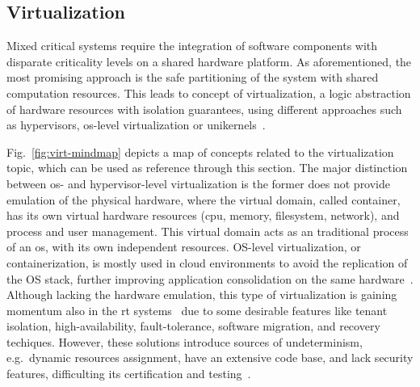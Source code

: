 
\subsection{Virtualization}%
\label{sec:virtualization}
Mixed critical systems require the integration of software components with
disparate criticality levels on a shared hardware platform. As aforementioned,
the most promising approach is the safe partitioning of the system with shared
computation resources. This leads to concept of virtualization, a logic
abstraction of hardware resources with isolation guarantees, using different approaches such as
hypervisors, \gls{os}-level virtualization or unikernels~\cite{cinque2022virtualizing}.

Fig.~\ref{fig:virt-mindmap} depicts a map of concepts related to the
virtualization topic, which can be used as reference through this section.
%
The major distinction between \gls{os}- and hypervisor-level virtualization is
the former does not provide emulation of the physical hardware, where the
virtual domain, called container, has its own virtual hardware resources
(\gls{cpu}, memory, filesystem, network), and process and user management. This
virtual domain acts as an traditional process of an \gls{os}, with its own
independent resources. OS-level virtualization, or containerization, is mostly
used in cloud environments to avoid the replication of the OS stack, further
improving application consolidation on the same
hardware~\cite{cinque2022virtualizing}. Although lacking the hardware emulation, this
type of virtualization is gaining momentum also in the \gls{rt} systems~\cite{xilinxRunX,struhar2020real} due to
some desirable features like tenant isolation, high-availability,
fault-tolerance, software migration, and recovery techiques. However, these
solutions introduce sources of undeterminism, e.g.~dynamic resources assignment,
have an extensive code base, and lack security features, difficulting its
certification and testing~\cite{cinque2022virtualizing}.

